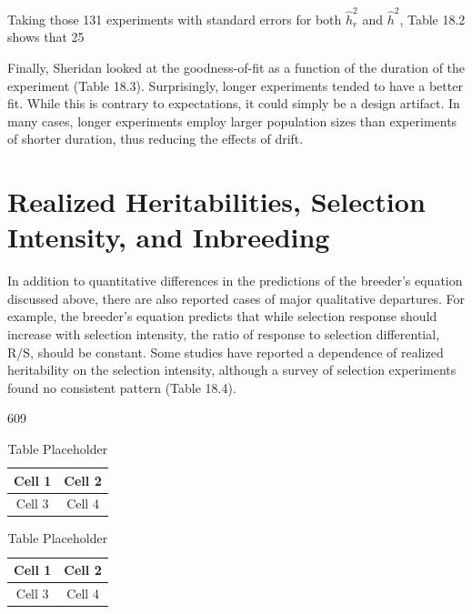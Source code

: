 \documentclass{article}
\begin{document}
Taking those 131 experiments with standard errors for both  $ \widehat{h}_{r}^{2} $ and  $ \widehat{h}^{2} $, Table 18.2 shows that 25%

Finally, Sheridan looked at the goodness-of-fit as a function of the duration of the experiment (Table 18.3). Surprisingly, longer experiments tended to have a better fit. While this is contrary to expectations, it could simply be a design artifact. In many cases, longer experiments employ larger population sizes than experiments of shorter duration, thus reducing the effects of drift.

\section{Realized Heritabilities, Selection Intensity, and Inbreeding}
In addition to quantitative differences in the predictions of the breeder's equation discussed above, there are also reported cases of major qualitative departures. For example, the breeder's equation predicts that while selection response should increase with selection intensity, the ratio of response to selection differential, R/S, should be constant. Some studies have reported a dependence of realized heritability on the selection intensity, although a survey of selection experiments found no consistent pattern (Table 18.4).

609

\begin{table}[h]
\centering
\begin{tabular}{|c|c|}
\hline
Cell 1 & Cell 2 \\
\hline
Cell 3 & Cell 4 \\
\hline
\end{tabular}
\caption{Table Placeholder}
\end{table}

\begin{table}[h]
\centering
\begin{tabular}{|c|c|}
\hline
Cell 1 & Cell 2 \\
\hline
Cell 3 & Cell 4 \\
\hline
\end{tabular}
\caption{Table Placeholder}
\end{table}
\end{document}
